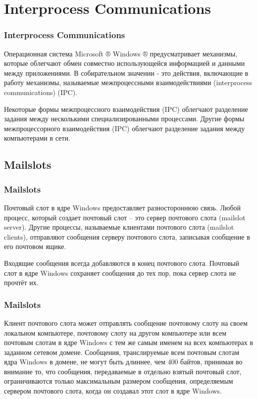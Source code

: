 \documentclass{beamer}
\begin{document}
\section{Interprocess Communications}

\begin{frame}
\frametitle{Interprocess Communications}

Операционная система Microsoft ® Windows ® предусматривает механизмы, которые облегчают обмен совместно использующейся информацией и данными между приложениями. В собирательном значении - это действия, включающие в работу механизмы, называемые межпроцессными взаимодействиями (interprocess communications) (IPC).
\medskip

Некоторые формы межпроцессного взаимодействия (IPC) облегчают разделение задания между несколькими специализированными процессами. Другие формы межпроцессорного взаимодействия (IPC) облегчают разделение задания между компьютерами в сети.

\end{frame}

\subsection{Mailslots}

\begin{frame}
\frametitle{Mailslots}

Почтовый слот в ядре Windows предоставляет разностороннюю связь. Любой процесс, который создает почтовый слот – это сервер почтового слота (mailslot server). Другие процессы, называемые клиентами почтового слота (mailslot clients), отправляют сообщения серверу почтового слота, записывая сообщение в его почтовом ящике.
\medskip

Входящие сообщения всегда добавляются в конец почтового слота. Почтовый слот в ядре Windows сохраняет сообщения до тех пор, пока сервер слота не прочтёт их. 
\end{frame}


\begin{frame}
\frametitle{Mailslots}

Клиент почтового слота может отправлять сообщение почтовому слоту на своем локальном компьютере, почтовому слоту на другом компьютере или всем почтовым слотам в ядре Windows с тем же самым именем на всех компьютерах в заданном сетевом домене. Сообщения, транслируемые всем почтовым слотам ядра Windows в домене, не могут быть длиннее, чем 400 байтов, принимая во внимание то, что сообщения, передаваемые в отдельно взятый почтовый слот, ограничиваются только максимальным размером сообщения, определяемым сервером почтового слота, когда он создавал этот слот в ядре Windows.

\end{frame}
\end{document}
